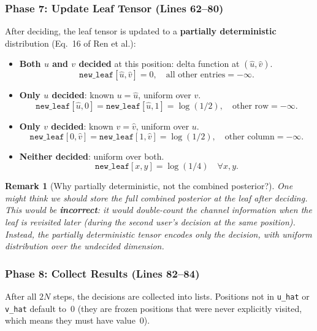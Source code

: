\documentclass[11pt,a4paper]{article}
\newtheorem{remark}{Remark}[section]
\begin{document}
\subsubsection{Phase 7: Update Leaf Tensor (Lines 62--80)}

After deciding, the leaf tensor is updated to a \textbf{partially deterministic} distribution (Eq.~16 of Ren et al.):

\begin{itemize}
    \item \textbf{Both $u$ and $v$ decided} at this position: delta function at $(\hat{u}, \hat{v})$.
    \[
    \texttt{new\_leaf}[\hat{u}, \hat{v}] = 0, \quad \text{all other entries} = -\infty.
    \]

    \item \textbf{Only $u$ decided}: known $u = \hat{u}$, uniform over $v$.
    \[
    \texttt{new\_leaf}[\hat{u}, 0] = \texttt{new\_leaf}[\hat{u}, 1] = \log(1/2), \quad \text{other row} = -\infty.
    \]

    \item \textbf{Only $v$ decided}: known $v = \hat{v}$, uniform over $u$.
    \[
    \texttt{new\_leaf}[0, \hat{v}] = \texttt{new\_leaf}[1, \hat{v}] = \log(1/2), \quad \text{other column} = -\infty.
    \]

    \item \textbf{Neither decided}: uniform over both.
    \[
    \texttt{new\_leaf}[x, y] = \log(1/4) \quad \forall x, y.
    \]
\end{itemize}

\begin{remark}[Why partially deterministic, not the combined posterior?]
One might think we should store the full combined posterior at the leaf after deciding. This would be \textbf{incorrect}: it would double-count the channel information when the leaf is revisited later (during the second user's decision at the same position). Instead, the partially deterministic tensor encodes \emph{only} the decision, with uniform distribution over the undecided dimension.
\end{remark}

\subsubsection{Phase 8: Collect Results (Lines 82--84)}

After all $2N$ steps, the decisions are collected into lists. Positions not in \texttt{u\_hat} or \texttt{v\_hat} default to~0 (they are frozen positions that were never explicitly visited, which means they must have value~0).
\end{document}
